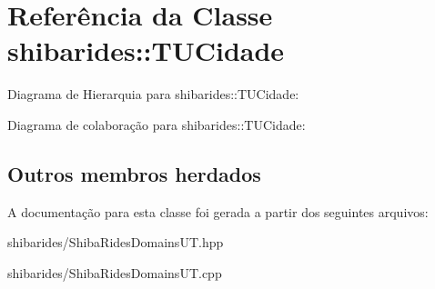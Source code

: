 \hypertarget{classshibarides_1_1TUCidade}{}\section{Referência da Classe shibarides\+:\+:T\+U\+Cidade}
\label{classshibarides_1_1TUCidade}


Diagrama de Hierarquia para shibarides\+:\+:T\+U\+Cidade\+:


Diagrama de colaboração para shibarides\+:\+:T\+U\+Cidade\+:
\subsection*{Outros membros herdados}


A documentação para esta classe foi gerada a partir dos seguintes arquivos\+:\begin{DoxyCompactItemize}
\item 
shibarides/Shiba\+Rides\+Domains\+U\+T.\+hpp\item 
shibarides/Shiba\+Rides\+Domains\+U\+T.\+cpp\end{DoxyCompactItemize}
